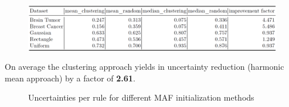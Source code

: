 \documentclass[aspectratio=169]{beamer}
\begin{document}
\begin{frame}
\begin{figure}
    \centering
    \includegraphics[width=1\linewidth]{../../fig/score_df.png}
\end{figure}
On average the clustering approach yields in uncertainty reduction (harmonic mean approach) by a factor of \textbf{2.61}.
\end{frame}

\begin{frame}
\begin{figure}
    \caption{Uncertainties per rule for different MAF initialization methods}
    \label{fig:bars_uncertainty}
\end{figure}
\end{frame}
\end{document}
